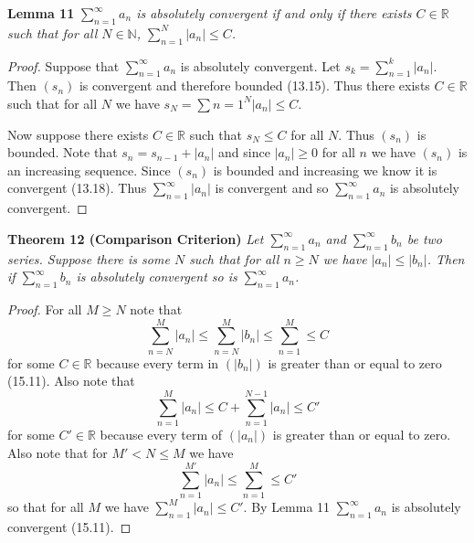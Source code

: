 \documentclass{article}
\begin{document}
\begin{flushleft}
\textbf{Lemma 11}
\textsl{$\sum_{n=1}^{\infty} a_n$ is absolutely convergent if and only if there exists $C \in \mathbb{R}$ such that for all $N \in \mathbb{N}$, $\sum_{n=1}^{N} |a_n| \leq C$.}
\begin{proof}
Suppose that $\sum_{n=1}^{\infty} a_n$ is absolutely convergent. Let $s_k = \sum_{n=1}^{k} |a_n|$. Then $(s_n)$ is convergent and therefore bounded (13.15). Thus there exists $C \in \mathbb{R}$ such that for all $N$ we have $s_N = \sum{n=1}^{N} |a_n| \leq C$.\newline

Now suppose there exists $C \in \mathbb{R}$ such that $s_N \leq C$ for all $N$. Thus $(s_n)$ is bounded. Note that $s_n = s_{n-1} + |a_n|$ and since $|a_n| \geq 0$ for all $n$ we have $(s_n)$ is an increasing sequence. Since $(s_n)$ is bounded and increasing we know it is convergent (13.18). Thus $\sum_{n=1}^{\infty} |a_n|$ is convergent and so $\sum_{n=1}^{\infty} a_n$ is absolutely convergent.
\end{proof}

\textbf{Theorem 12 (Comparison Criterion)}
\textsl{Let $\sum_{n=1}^{\infty} a_n$ and $\sum_{n=1}^{\infty} b_n$ be two series. Suppose there is some $N$ such that for all $n \geq N$ we have $|a_n| \leq |b_n|$. Then if $\sum_{n=1}^{\infty} b_n$ is absolutely convergent so is $\sum_{n=1}^{\infty} a_n$.}
\begin{proof}
For all $M \geq N$ note that
\[
\sum_{n=N}^{M} |a_n| \leq \sum_{n=N}^{M} |b_n| \leq \sum_{n=1}^{M} \leq C
\]
for some $C \in \mathbb{R}$ because every term in $(|b_n|)$ is greater than or equal to zero (15.11). Also note that
\[
\sum_{n=1}^{M} |a_n| \leq C + \sum_{n=1}^{N-1} |a_n| \leq C'
\]
for some $C' \in \mathbb{R}$ because every term of $(|a_n|)$ is greater than or equal to zero. Also note that for $M' < N \leq M$ we have
\[
\sum_{n=1}^{M'} |a_n| \leq \sum_{n=1}^{M} \leq C'
\]
so that for all $M$ we have $\sum_{n=1}^{M} |a_n| \leq C'$. By Lemma 11 $\sum_{n=1}^{\infty} a_n$ is absolutely convergent (15.11).
\end{proof}


\end{flushleft}
\end{document}
